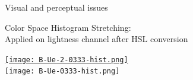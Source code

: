 \documentclass[notes]{beamer}
\begin{document}
\begin{frame}{Visual and perceptual issues}
    \begin{beamerboxesrounded}{Color Space Histogram Stretching:\\Applied on lightness channel after HSL conversion}
    \begin{center}
    \href{run:B-Ue-2-30fps-10fps.mp4}{\texttt{[image: B-Ue-2-0333-hist.png]}}\\
    \texttt{[image: B-Ue-0333-hist.png]}
    \end{center}
    \end{beamerboxesrounded}
\end{frame}

\end{document}
